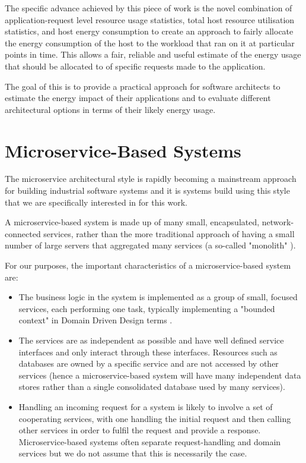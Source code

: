 The specific advance achieved by this piece of work is the novel combination of application-request level resource usage statistics, total host resource utilisation statistics, and host energy consumption to create an approach to fairly allocate the energy consumption of the host to the workload that ran on it at particular points in time.  This allows a fair, reliable and useful estimate of the energy usage that should be allocated to of specific requests made to the application.

The goal of this is to provide a practical approach for software architects to estimate the energy impact of their applications and to evaluate different architectural options in terms of their likely energy usage.

\section{Microservice-Based Systems}

The microservice architectural style \cite{richardson2018_microservices} is rapidly becoming a mainstream approach for building industrial software systems and it is systems build using this style that we are specifically interested in for this work.

A microservice-based system is made up of many small, encapsulated, network-connected services, rather than the more traditional approach of having a small number of large servers that aggregated many services (a so-called "monolith" \cite{mazlami2017_microservices_monoliths}).

For our purposes, the important characteristics of a microservice-based system are:

\begin{itemize}
\item The business logic in the system is implemented as a group of small, focused services, each performing one task, typically implementing a "bounded context" in Domain Driven Design terms \cite{evans2006_ddd}.
\item The services are as independent as possible and have well defined service interfaces and only interact through these interfaces.  Resources such as databases are owned by a specific service and are not accessed by other services (hence a microservice-based system will have many independent data stores rather than a single consolidated database used by many services).
\item Handling an incoming request for a system is likely to involve a set of cooperating services, with one handling the initial request and then calling other services in order to fulfil the request and provide a response.  Microservice-based systems often separate request-handling and domain services but we do not assume that this is necessarily the case.
\end{itemize}

